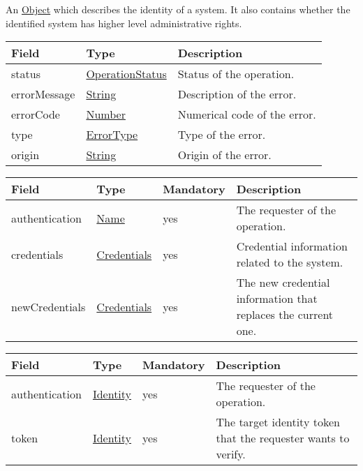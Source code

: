 \documentclass[a4paper]{arrowhead}
\newcommand{\pref}[1]{{\textcolor{ArrowheadGrey}{\hyperref[sec:model:primitives:#1]{#1}}}}
\begin{document}

An \pref{Object} which describes the identity of a system. It also contains whether the identified system has higher level administrative rights.


\begin{table}[ht!]
\begin{tabularx}{\textwidth}{| p{4.25cm} | p{3.5cm} | X |} \hline
\rowcolor{gray!33} Field & Type      & Description \\ \hline
status & \pref{OperationStatus} & Status of the operation. \\ \hline
errorMessage & \pref{String} & Description of the error. \\ \hline
errorCode &\pref{Number}  & Numerical code of the error. \\ \hline
type & \pref{ErrorType} & Type of the error. \\ \hline
origin & \pref{String} & Origin of the error. \\ \hline
\end{tabularx}
\end{table}


\begin{table}[ht!]
\begin{tabularx}{\textwidth}{| p{3cm} | p{3cm} | p{2cm} | X |} \hline
\rowcolor{gray!33} Field & Type & Mandatory & Description \\ \hline
authentication & \pref{Name} & yes & The requester of the operation. \\ \hline
credentials & \hyperref[sec:model:Credentials]{Credentials} & yes & Credential information related to the system. \\ \hline
newCredentials &\hyperref[sec:model:Credentials]{Credentials} & yes & The new credential information that replaces the current one. \\ \hline
\end{tabularx}
\end{table}


\begin{table}[ht!]
\begin{tabularx}{\textwidth}{| p{3cm} | p{3cm} | p{2cm} | X |} \hline
\rowcolor{gray!33} Field & Type & Mandatory & Description \\ \hline
authentication &\hyperref[sec:model:Identity]{Identity} & yes & The requester of the operation. \\ \hline
token &\hyperref[sec:model:Identity]{Identity} & yes & The target identity token that the requester wants to verify. \\ \hline
\end{tabularx}
\end{table}
\end{document}
